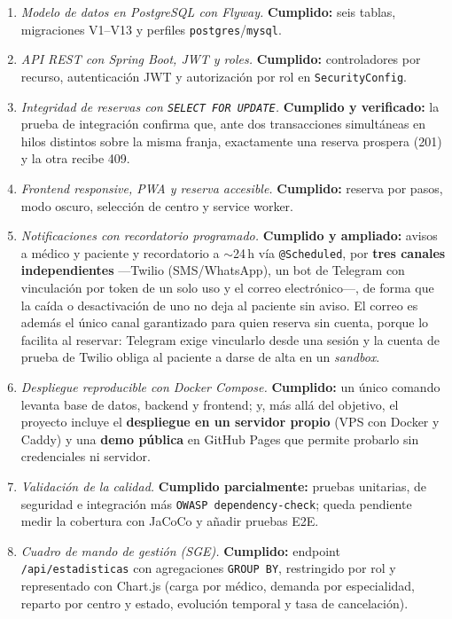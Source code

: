 \documentclass[12pt,a4paper]{report}
\begin{document}
\begin{enumerate}
  \item \emph{Modelo de datos en PostgreSQL con Flyway.} \textbf{Cumplido:} seis tablas, migraciones V1--V13 y perfiles \texttt{postgres}/\texttt{mysql}.
  \item \emph{API REST con Spring Boot, JWT y roles.} \textbf{Cumplido:} controladores por recurso, autenticación JWT y autorización por rol en \texttt{SecurityConfig}.
  \item \emph{Integridad de reservas con \texttt{SELECT FOR UPDATE}.} \textbf{Cumplido y verificado:} la prueba de integración confirma que, ante dos transacciones simultáneas en hilos distintos sobre la misma franja, exactamente una reserva prospera (201) y la otra recibe 409.
  \item \emph{Frontend responsive, PWA y reserva accesible.} \textbf{Cumplido:} reserva por pasos, modo oscuro, selección de centro y service worker.
  \item \emph{Notificaciones con recordatorio programado.} \textbf{Cumplido y ampliado:} avisos a médico y paciente y recordatorio a $\sim$24\,h vía \texttt{@Scheduled}, por \textbf{tres canales independientes} —Twilio (SMS/WhatsApp), un bot de Telegram con vinculación por token de un solo uso y el correo electrónico—, de forma que la caída o desactivación de uno no deja al paciente sin aviso. El correo es además el único canal garantizado para quien reserva sin cuenta, porque lo facilita al reservar: Telegram exige vincularlo desde una sesión y la cuenta de prueba de Twilio obliga al paciente a darse de alta en un \emph{sandbox}.
  \item \emph{Despliegue reproducible con Docker Compose.} \textbf{Cumplido:} un único comando levanta base de datos, backend y frontend; y, más allá del objetivo, el proyecto incluye el \textbf{despliegue en un servidor propio} (VPS con Docker y Caddy) y una \textbf{demo pública} en GitHub Pages que permite probarlo sin credenciales ni servidor.
  \item \emph{Validación de la calidad.} \textbf{Cumplido parcialmente:} pruebas unitarias, de seguridad e integración más \texttt{OWASP dependency-check}; queda pendiente medir la cobertura con JaCoCo y añadir pruebas E2E.
  \item \emph{Cuadro de mando de gestión (SGE).} \textbf{Cumplido:} endpoint \texttt{/api/estadisticas} con agregaciones \texttt{GROUP BY}, restringido por rol y representado con Chart.js (carga por médico, demanda por especialidad, reparto por centro y estado, evolución temporal y tasa de cancelación).
\end{enumerate}
\end{document}
